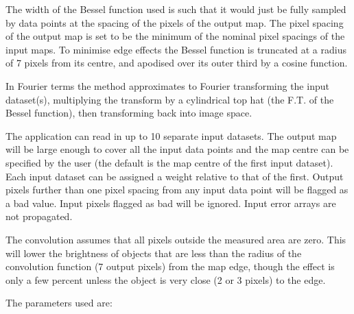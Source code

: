 \documentclass[twoside,11pt,nolof]{starlink}
\begin{document}
The width of the Bessel function used is such that it would just be
fully  sampled by data points at the spacing of the pixels of the
output  map. The pixel spacing of the output map is set to be the
minimum  of the nominal pixel spacings of the input maps. To minimise
edge  effects the Bessel function is truncated at a radius of 7 pixels
from its centre, and apodised over its outer third by a cosine
function.

In Fourier terms the method approximates to Fourier transforming the
input dataset(s), multiplying the transform by a cylindrical top hat
(the F.T. of the Bessel function), then transforming back into image
space.

The application can read in up to 10 separate input datasets. The
output map will be large enough to cover all the input data  points
and the map centre can be specified by the user (the  default is the
map centre of the first input dataset). Each input  dataset can be
assigned a weight relative to that of the first.  Output pixels
further than one pixel spacing from any input data  point will be
flagged as a bad value. Input pixels flagged as bad will be ignored.
Input error arrays are not propagated.

The convolution assumes that all pixels outside the measured  area are
zero. This will lower the brightness of objects that are  less than
the radius of the convolution function (7 output pixels)  from the map
edge, though the effect is only a few percent unless  the object is
very close (2 or 3 pixels) to the edge.

\goodbreak

The parameters used are:
\end{document}
